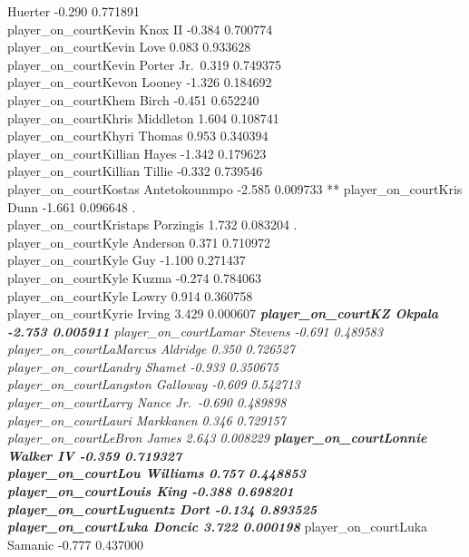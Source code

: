 \documentclass[
  landscape]{article}
\begin{document}
Huerter -0.290 0.771891\\
player\_on\_courtKevin Knox II -0.384 0.700774\\
player\_on\_courtKevin Love 0.083 0.933628\\
player\_on\_courtKevin Porter Jr.~0.319 0.749375\\
player\_on\_courtKevon Looney -1.326 0.184692\\
player\_on\_courtKhem Birch -0.451 0.652240\\
player\_on\_courtKhris Middleton 1.604 0.108741\\
player\_on\_courtKhyri Thomas 0.953 0.340394\\
player\_on\_courtKillian Hayes -1.342 0.179623\\
player\_on\_courtKillian Tillie -0.332 0.739546\\
player\_on\_courtKostas Antetokounmpo -2.585 0.009733 **
player\_on\_courtKris Dunn -1.661 0.096648 .\\
player\_on\_courtKristaps Porzingis 1.732 0.083204 .\\
player\_on\_courtKyle Anderson 0.371 0.710972\\
player\_on\_courtKyle Guy -1.100 0.271437\\
player\_on\_courtKyle Kuzma -0.274 0.784063\\
player\_on\_courtKyle Lowry 0.914 0.360758\\
player\_on\_courtKyrie Irving 3.429 0.000607 \emph{\textbf{
player\_on\_courtKZ Okpala -2.753 0.005911 } player\_on\_courtLamar
Stevens -0.691 0.489583\\
player\_on\_courtLaMarcus Aldridge 0.350 0.726527\\
player\_on\_courtLandry Shamet -0.933 0.350675\\
player\_on\_courtLangston Galloway -0.609 0.542713\\
player\_on\_courtLarry Nance Jr.~-0.690 0.489898\\
player\_on\_courtLauri Markkanen 0.346 0.729157\\
player\_on\_courtLeBron James 2.643 0.008229 \textbf{
player\_on\_courtLonnie Walker IV -0.359 0.719327\\
player\_on\_courtLou Williams 0.757 0.448853\\
player\_on\_courtLouis King -0.388 0.698201\\
player\_on\_courtLuguentz Dort -0.134 0.893525\\
player\_on\_courtLuka Doncic 3.722 0.000198 }} player\_on\_courtLuka
Samanic -0.777 0.437000\\
\end{document}
